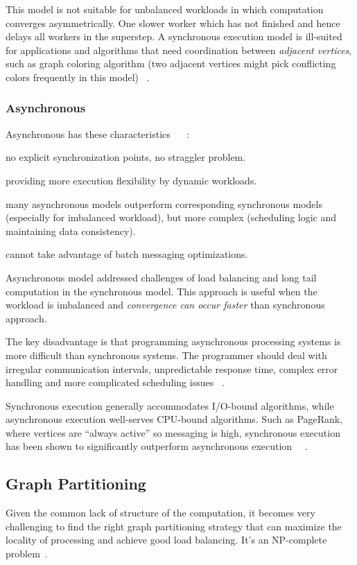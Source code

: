\documentclass[UTF8,12pt,a4paper]{article}
\begin{document}
This model is not suitable for unbalanced workloads
in which computation converges asymmetrically.
One slower worker which has not finished and
hence delays all workers in the superstep.
A synchronous execution model is ill-suited
for applications and algorithms that need coordination between \textit{adjacent vertices},
such as graph coloring algorithm
(two adjacent vertices might pick conflicting colors frequently in this model)
~\cite{DBLP:journals/csur/HeidariSCB18}.

\subsubsection{Asynchronous}
Asynchronous has these characteristics
~\cite{DBLP:journals/csur/McCuneWM15}
~\cite{DBLP:journals/csur/HeidariSCB18}:
\begin{compactitem}
  \item no explicit synchronization points, no straggler problem.
  \item providing more execution flexibility by dynamic workloads.
  \item many asynchronous models outperform corresponding synchronous models
  (especially for imbalanced workload),
  but more complex (scheduling logic and maintaining data consistency).
  \item cannot take advantage of batch messaging optimizations.
\end{compactitem}

Asynchronous model addressed challenges of
load balancing and long tail computation in the synchronous model.
This approach is useful when the workload is imbalanced
and \textit{convergence can occur faster} than synchronous approach.

The key disadvantage is that programming asynchronous processing systems
is more difficult than synchronous systems.
The programmer should deal with irregular communication intervals,
unpredictable response time, complex error handling
and more complicated scheduling issues
~\cite{DBLP:journals/csur/HeidariSCB18}.

Synchronous execution generally accommodates I/O-bound algorithms,
while asynchronous execution well-serves CPU-bound algorithms.
Such as PageRank, where vertices are ``always active'' so messaging is high,
synchronous execution has been shown to significantly outperform asynchronous execution
~\cite{DBLP:journals/csur/McCuneWM15}~\cite{DBLP:journals/csur/HeidariSCB18}.

\subsection{Graph Partitioning}
Given the common lack of structure of the computation,
it becomes very challenging to find the right graph partitioning strategy
that can maximize the locality of processing and achieve good load balancing.
It's an NP-complete problem~\cite{DBLP:conf/spaa/AndreevR04}.
\end{document}
